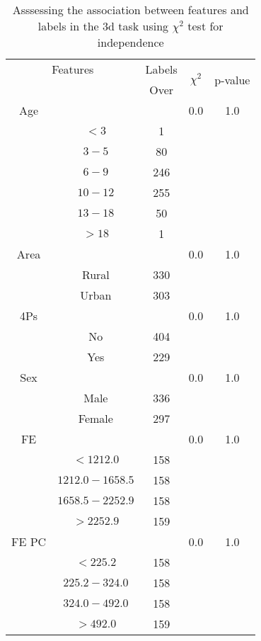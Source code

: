 \begin{table}[!htb]
\centering
\caption{Asssessing the association between features and labels in the 3d task using $\chi^2$ test for independence}
\label{tab:chitest_3d}
\begin{tabular}{c c | c| c | c}
\hline
\multicolumn{2}{c|}{Features}& \multicolumn{1}{c|}{Labels}& \multirow{2}{*}{$\chi^2$} & \multirow{2}{*}{p-value}\\ 
& & Over & & \\ 
\hline
Age &  & & 0.0 & 1.0 \\ 
& $< 3$ & 1& & \\ 
& $3-5$ & 80& & \\ 
& $6-9$ & 246& & \\ 
& $10-12$ & 255& & \\ 
& $13-18$ & 50& & \\ 
& $> 18$ & 1& & \\ 
\hline 
Area &  & & 0.0 & 1.0 \\ 
& Rural & 330& & \\ 
& Urban & 303& & \\ 
\hline 
4Ps &  & & 0.0 & 1.0 \\ 
& No & 404& & \\ 
& Yes & 229& & \\ 
\hline 
Sex &  & & 0.0 & 1.0 \\ 
& Male & 336& & \\ 
& Female & 297& & \\ 
\hline 
FE &  & & 0.0 & 1.0 \\ 
& $< 1212.0$ & 158& & \\ 
& $1212.0-1658.5$ & 158& & \\ 
& $1658.5-2252.9$ & 158& & \\ 
& $> 2252.9$ & 159& & \\ 
\hline 
FE PC &  & & 0.0 & 1.0 \\ 
& $< 225.2$ & 158& & \\ 
& $225.2-324.0$ & 158& & \\ 
& $324.0-492.0$ & 158& & \\ 
& $> 492.0$ & 159& & \\ 
\hline 
\end{tabular}
\end{table}

